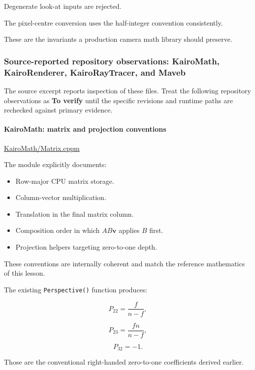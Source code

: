 Degenerate look-at inputs are rejected.

The pixel-centre conversion uses the half-integer convention consistently.

These are the invariants a production camera math library should preserve.

\subsubsection{Source-reported repository observations: KairoMath, KairoRenderer, KairoRayTracer, and Maveb}\label{source-reported-repository-observations-kairomath-kairorenderer-kairoraytracer-and-maveb}

The source excerpt reports inspection of these files. Treat the following repository observations as \textbf{To verify} until the specific revisions and runtime paths are rechecked against primary evidence.

\paragraph{KairoMath: matrix and projection conventions}\label{kairomath-matrix-and-projection-conventions}

\href{https://github.com/swayam8624/KairoMath/blob/master/Matrix.cppm?utm_source=chatgpt.com}{KairoMath/Matrix.cppm}

The module explicitly documents:

\begin{itemize}
\tightlist
\item
  Row-major CPU matrix storage.
\item
  Column-vector multiplication.
\item
  Translation in the final matrix column.
\item
  Composition order in which \(AB\mathbf v\) applies \(B\) first.
\item
  Projection helpers targeting zero-to-one depth.
\end{itemize}

These conventions are internally coherent and match the reference mathematics of this lesson.

The existing \texttt{Perspective()} function produces:

\[
 P_{22}=\frac f{n-f},
\]

\[
 P_{23}=\frac{fn}{n-f},
\]

\[
 P_{32}=-1.
\]

Those are the conventional right-handed zero-to-one coefficients derived earlier.


